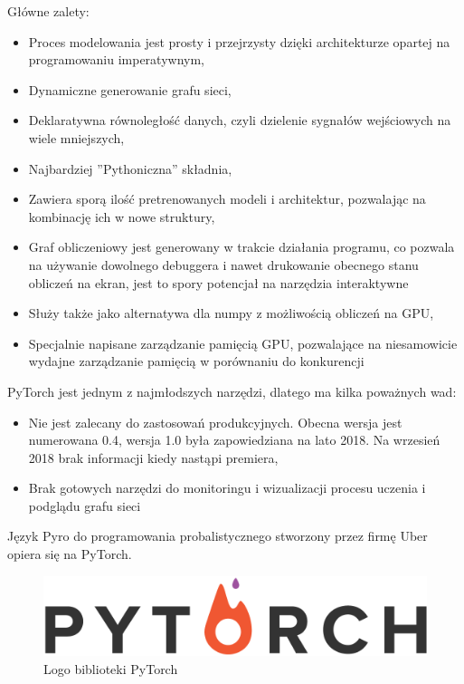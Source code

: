 \documentclass[12pt,a4paper,twoside,titlepage,openright]{book}
\begin{document}
Główne zalety:
\begin{itemize}
\item Proces modelowania jest prosty i przejrzysty dzięki architekturze opartej na programowaniu imperatywnym,
\item Dynamiczne generowanie grafu sieci,
\item Deklaratywna równoległość danych, czyli dzielenie sygnałów wejściowych na wiele mniejszych,
\item Najbardziej ''Pythoniczna'' składnia,
\item Zawiera sporą ilość pretrenowanych modeli i architektur, pozwalając na kombinację ich w nowe struktury,
\item Graf obliczeniowy jest generowany w trakcie działania programu, co pozwala na używanie dowolnego debuggera i nawet drukowanie obecnego stanu obliczeń na ekran, jest to spory potencjał na narzędzia interaktywne
\item Służy także jako alternatywa dla numpy z możliwością obliczeń na GPU,
\item Specjalnie napisane zarządzanie pamięcią GPU, pozwalające na niesamowicie wydajne zarządzanie pamięcią w porównaniu do konkurencji
\end{itemize}

PyTorch jest jednym z najmłodszych narzędzi, dlatego ma kilka poważnych wad:
\begin{itemize}
\item Nie jest zalecany do zastosowań produkcyjnych. Obecna wersja jest numerowana 0.4, wersja 1.0 była zapowiedziana na lato 2018. Na wrzesień 2018 brak informacji kiedy nastąpi premiera,
\item Brak gotowych narzędzi do monitoringu i wizualizacji procesu uczenia i podglądu grafu sieci
\end{itemize}

Język Pyro do programowania probalistycznego stworzony przez firmę Uber opiera się na PyTorch.

\begin{figure}[h]
	\centering
			\includegraphics[resolution=100, scale=0.3]{PyTorch.png}
		\caption{Logo biblioteki PyTorch}
\end{figure}
\end{document}

